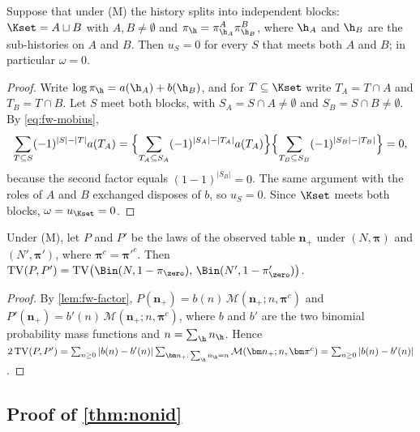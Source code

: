 \begin{lemma}\label{lem:id-block}
Suppose that under (M) the history splits into independent blocks: $\Kset=A\sqcup B$ with $A,B\neq\emptyset$ and $\pi_{\h}=\pi^A_{\h_A}\pi^B_{\h_B}$, where $\h_A$ and $\h_B$ are the sub-histories on $A$ and $B$. Then $u_S=0$ for every $S$ that meets both $A$ and $B$; in particular $\omega=0$.
\end{lemma}

\begin{proof}
Write $\log\pi_{\h}=a(\h_A)+b(\h_B)$, and for $T\subseteq\Kset$ write $T_A=T\cap A$ and $T_B=T\cap B$. Let $S$ meet both blocks, with $S_A=S\cap A\neq\emptyset$ and $S_B=S\cap B\neq\emptyset$. By \eqref{eq:fw-mobius},
\[
  \sum_{T\subseteq S}(-1)^{|S|-|T|}a(T_A)
  =\Bigl\{\sum_{T_A\subseteq S_A}(-1)^{|S_A|-|T_A|}a(T_A)\Bigr\}\Bigl\{\sum_{T_B\subseteq S_B}(-1)^{|S_B|-|T_B|}\Bigr\}=0,
\]
because the second factor equals $(1-1)^{|S_B|}=0$. The same argument with the roles of $A$ and $B$ exchanged disposes of $b$, so $u_S=0$. Since $\Kset$ meets both blocks, $\omega=u_{\Kset}=0$.
\end{proof}

\begin{lemma}\label{lem:id-tv}
Under (M), let $P$ and $P'$ be the laws of the observed table $\bm n_+$ under $(N,\bm\pi)$ and $(N',\bm\pi')$, where $\bm\pi^c=\bm\pi'^c$. Then $\mathrm{TV}(P,P')=\mathrm{TV}\bigl(\Bin(N,1-\pi_{\zero}),\,\Bin(N',1-\pi'_{\zero})\bigr)$.
\end{lemma}

\begin{proof}
By \cref{lem:fw-factor}, $P(\bm n_+)=b(n)\,\mathcal M(\bm n_+;n,\bm\pi^c)$ and $P'(\bm n_+)=b'(n)\,\mathcal M(\bm n_+;n,\bm\pi^c)$, where $b$ and $b'$ are the two binomial probability mass functions and $n=\sum_{\h}n_{\h}$. Hence
$2\,\mathrm{TV}(P,P')=\sum_{n\ge0}|b(n)-b'(n)|\sum_{\bm n_+:\,\sum_{\h}n_{\h}=n}\mathcal M(\bm n_+;n,\bm\pi^c)=\sum_{n\ge0}|b(n)-b'(n)|$.
\end{proof}

\subsection{Proof of \texorpdfstring{\cref{thm:nonid}}{the non-identification theorem}}\label{app:id-nonid}

